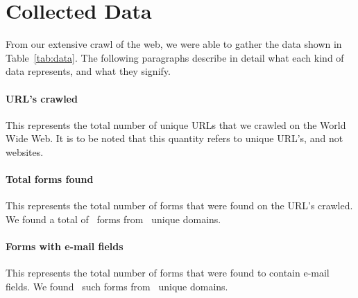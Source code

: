 \section{Collected Data}
From our extensive crawl of the web, we were able to gather the data shown in Table~\ref{tab:data}. The following paragraphs describe in detail what each kind of data represents, and what they signify.



\paragraph{URL's crawled}
This represents the total number of unique URLs that we crawled on the World Wide Web. It is to be noted that this quantity refers to unique URL's, and not websites.

\paragraph{Total forms found}
This represents the total number of forms that were found on the URL's crawled. We found a total of \forms\ forms from 
\uniqueforms\ unique domains.

\paragraph{Forms with e-mail fields}
This represents the total number of forms that were found to contain e-mail fields. We found \emailforms\ such forms from \uniqueemailforms\ unique domains.
